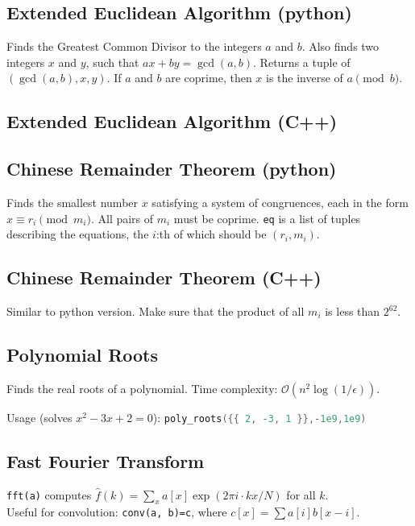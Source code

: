 \documentclass{article}
\begin{document}
\subsection*{Extended Euclidean Algorithm (python)}
Finds the Greatest Common Divisor to the integers $a$ and $b$. Also finds two integers $x$ and $y$, such that $ax+by=\gcd(a,b)$.
Returns a tuple of $(\gcd(a, b), x, y)$. If $a$ and $b$ are coprime, then $x$ is the inverse of $a \pmod{b}$.


\subsection*{Extended Euclidean Algorithm (C++)}


\pagebreak

\subsection*{Chinese Remainder Theorem (python)}
Finds the smallest number $x$ satisfying a system of congruences, each in the form $x \equiv r_i \pmod{m_i}$. All pairs of $m_i$ must be coprime.
\lstinline{eq} is a list of tuples describing the equations, the $i$:th of which should be $(r_i, m_i)$.


\subsection*{Chinese Remainder Theorem (C++)}
Similar to python version. Make sure that the product of all $m_i$ is less than $2^{62}$.


\subsection*{Polynomial Roots}

Finds the real roots of a polynomial. Time complexity: $\mathcal{O}(n^2 \log(1/\epsilon))$.

Usage (solves $x^2-3x+2 = 0$): \lstinline[language=C++]|poly_roots({{ 2, -3, 1 }},-1e9,1e9)|



\subsection*{Fast Fourier Transform}
\lstinline{fft(a)} computes $\hat f(k) = \sum_x a[x] \exp(2\pi i \cdot k x / N)$ for all $k$.\\
Useful for convolution: \lstinline{conv(a, b)=c}, where $c[x] = \sum a[i]b[x-i]$.
\end{document}
